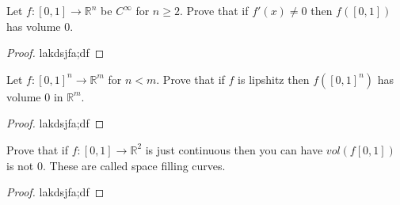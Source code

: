 \documentclass[12pt]{exam}
\begin{document}
\begin{questions}
\question 
Let $f: [0,1] \rightarrow \mathbb{R}^n$ be $C^\infty$ for $n \geq 2$. Prove that if $f'(x) \neq 0$ then $f([0,1])$ has volume $0$.\newline
\begin{proof}
    lakdsjfa;df
\end{proof}

\question Let $f:[0,1]^n \rightarrow \mathbb{R}^m$ for $n < m$. Prove that if $f$ is lipshitz then $f([0,1]^n)$ has volume $0$ in $\mathbb{R}^m$. 
\begin{proof}
    lakdsjfa;df
\end{proof}
\question Prove that if $f:[0,1] \rightarrow \mathbb{R}^2$ is just continuous then you can have $vol(f[0,1])$ is not $0$. These are called space filling curves. 
\begin{proof}
    lakdsjfa;df
\end{proof}
\end{questions}
\end{document}
